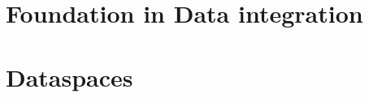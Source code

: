 \documentclass[a4paper,12pt,titlepage, openany, openright, cleardoubleempty]{scrreprt} %
\begin{document}
\graphicspath{{pics/}}

\pagestyle{empty}




\pagestyle{fancy}



\tableofcontents

\cleardoublepage %

\listoftables
{}

\listoffigures
{}

\cleardoublepage
{}

%


\chapter{Foundation in Data integration}

\chapter{Dataspaces} \label{chapter_dataspaces}


%
%
%
%

\end{document}
